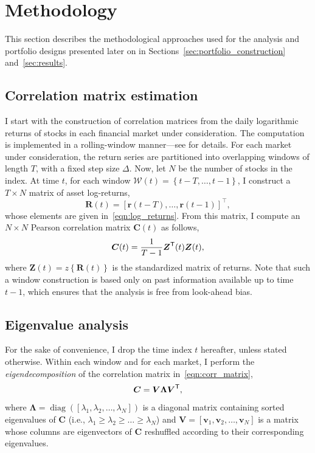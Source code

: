 \documentclass[pdflatex,sn-basic]{sn-jnl}%
\theoremstyle{thmstyleone}%
\theoremstyle{thmstyletwo}%
\theoremstyle{thmstylethree}%
\newcommand{\br}{\boldsymbol{r}}
\newcommand{\bv}{\boldsymbol{v}}
\newcommand{\bV}{\boldsymbol{V}}
\newcommand{\bR}{\boldsymbol{R}}
\newcommand{\bC}{\boldsymbol{C}}
\newcommand{\bZ}{\boldsymbol{Z}}
\newcommand{\bLambda}{\boldsymbol{\Lambda}}
\newcommand{\calW}{\mathcal{W}}
\DeclareMathOperator{\diag}{diag}
\newcommand{\T}{\textnormal{\textsf{T}}}
\newcommand{\brc}[1]{\left( #1 \right)}
\newcommand{\figbrc}[1]{\left\{ #1 \right\} }
\begin{document}
\section{Methodology}
\label{sec:method}

This section describes the methodological approaches used for the analysis and portfolio designs presented later on 
in Sections~\ref{sec:portfolio_construction} and~\ref{sec:results}. 

\subsection{Correlation matrix estimation}
\label{sec:rolling_window}
I start with the construction of correlation matrices from 
the daily logarithmic returns of stocks in each financial market under consideration. The computation is 
implemented in a rolling-window manner---see \citep{song2011evolution,adams2017correlations} for details.
For each market under consideration, the return series are partitioned into overlapping windows of length $T$, 
with a fixed step size $\Delta$. Now, let $N$ be the number of stocks in the index. At time $t$, 
for each window $\calW(t)=\figbrc{t-T, \ldots, t-1}$, I construct a $T\times N$ matrix of asset log-returns,
\begin{equation}
\label{eqn:return_matrix}
    \bR(t) = [\br(t-T), \ldots, \br(t-1)]^{\top},
\end{equation}
whose elements are given in~\eqref{eqn:log_returns}. From this matrix, I compute an $N \times N$ Pearson correlation matrix $\bC(t)$ as follows,
\begin{equation}
\label{eqn:corr_matrix}
    \bC(t) = \frac{1}{T-1} \bZ^{\T}(t)\bZ(t),
\end{equation}
where $\bZ(t) = z\figbrc{\bR(t)}$ is the standardized matrix of returns. Note that such a window construction is based only on past information available up to time $t-1$, which ensures that the analysis is free from look-ahead bias.

\subsection{Eigenvalue analysis}
For the sake of convenience, I drop the time index $t$ hereafter, unless stated otherwise. Within each window and for each market, I perform the \textit{eigendecomposition} of the correlation matrix in~\eqref{eqn:corr_matrix}, 
\begin{equation}
\label{eqn:eigendecomposition}
    \bC = \bV \bLambda \bV^{\T},
\end{equation}
where $\bLambda = \diag\brc{[\lambda_1, \lambda_2, \ldots, \lambda_N]}$ is a diagonal matrix containing sorted eigenvalues of $\bC$ (i.e., $\lambda_1 \geq \lambda_2 \geq \ldots \geq \lambda_N$) and $\bV = [\bv_1, \bv_2, \ldots, \bv_N]$ is a matrix whose columns are eigenvectors of $\bC$ reshuffled according to their corresponding eigenvalues.
\end{document}

